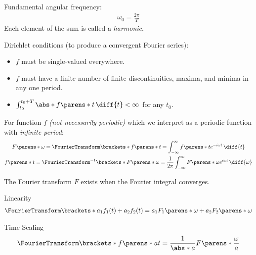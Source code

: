 \begin{multicols}{2}
\begin{CheatsheetEntryFrame}
        Fundamental angular frequency:
        \begin{gather*}
            \omega_0 = \frac{2 \pi}{T}
        \end{gather*}
        Each element of the sum is called a \emph{harmonic}.

        Dirichlet conditions (to produce a convergent Fourier series):
        \begin{itemize}
            \item $f$ must be single-valued everywhere.
            \item $f$ must have a finite number of finite discontinuities, maxima, and minima in any one period.
            \item $\int_{t_0}^{t_0+T} \abs*{f\parens*{t}} \,\diff{t} < \infty$ for any $t_0$.
        \end{itemize}

    \end{CheatsheetEntryFrame}

    \begin{CheatsheetEntryFrame}


        For function $f$ \emph{(not necessarily periodic)} which we interpret as a periodic function with \emph{infinite period}:
        \begin{gather*}
            F\parens*{\omega}
            = \FourierTransform\brackets*{f\parens*{t}}
            = \int_{-\infty}^\infty f\parens*{t} e^{-i \omega t} \,\diff{t}
            \\
            f\parens*{t}
            = \FourierTransform^{-1}\brackets*{F\parens*{\omega}}
            = \frac{1}{2 \pi}
            \int_{-\infty}^\infty F\parens*{\omega} e^{i \omega t} \,\diff{\omega}
        \end{gather*}

        The Fourier transform $F$ exists when the Fourier integral converges.

        \begin{center}
            Linearity
            \begin{gather*}
                \FourierTransform\brackets*{a_1 f_1(t) + a_2 f_2(t)}
                = a_1 F_1\parens*{\omega} + a_2 F_2\parens*{\omega}
            \end{gather*}

            Time Scaling
            \begin{gather*}
                \FourierTransform\brackets*{f\parens*{a t}}
                = \frac{1}{\abs*{a}} F\parens*{\frac{\omega}{a}}
            \end{gather*}


\end{center}
\end{CheatsheetEntryFrame}
\end{multicols}
